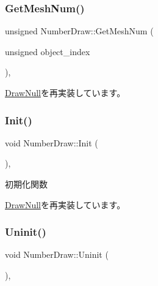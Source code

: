 \subsubsection{\texorpdfstring{Get\+Mesh\+Num()}{GetMeshNum()}}
{\footnotesize\ttfamily unsigned Number\+Draw\+::\+Get\+Mesh\+Num (\begin{DoxyParamCaption}\item[{unsigned}]{object\+\_\+index }\end{DoxyParamCaption})\hspace{0.3cm}{\ttfamily [override]}, {\ttfamily [virtual]}}



\mbox{\hyperlink{class_draw_null_ad735978a85a5f3583eecd82d6bfe6413}{Draw\+Null}}を再実装しています。

\mbox{\label{class_number_draw_ad52c1e8b9ae6e830a82c440cc18cb6c9}} 
\subsubsection{\texorpdfstring{Init()}{Init()}}
{\footnotesize\ttfamily void Number\+Draw\+::\+Init (\begin{DoxyParamCaption}{ }\end{DoxyParamCaption})\hspace{0.3cm}{\ttfamily [override]}, {\ttfamily [virtual]}}



初期化関数 



\mbox{\hyperlink{class_draw_null_acd7fef3ccea1da537ac9507ffbb6dd2e}{Draw\+Null}}を再実装しています。

\mbox{\label{class_number_draw_a2b203d101f23f0d3f584937ff5ad662a}} 
\subsubsection{\texorpdfstring{Uninit()}{Uninit()}}
{\footnotesize\ttfamily void Number\+Draw\+::\+Uninit (\begin{DoxyParamCaption}{ }\end{DoxyParamCaption})\hspace{0.3cm}{\ttfamily [override]}, {\ttfamily [virtual]}}




